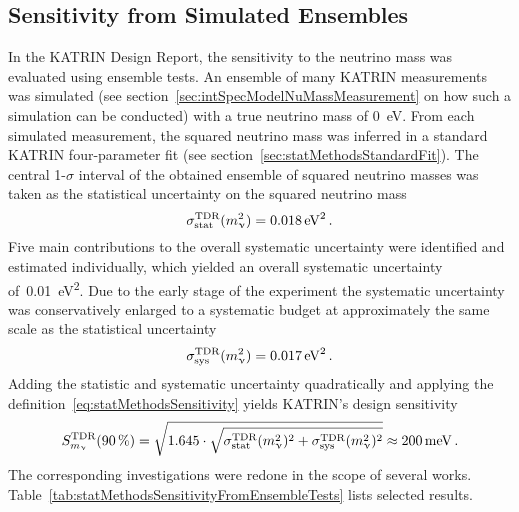 \subsection{Sensitivity from Simulated Ensembles}
\label{sec:statMethodsSensitivtyFromEnsemble}
In the KATRIN Design Report, the sensitivity to the neutrino mass was evaluated using ensemble tests. An ensemble of many KATRIN measurements was simulated (see section~\ref{sec:intSpecModelNuMassMeasurement} on how such a simulation can be conducted) with a true neutrino mass of \SI{0}{eV}. From each simulated measurement, the squared neutrino mass was inferred in a standard KATRIN four-parameter fit (see section~\ref{sec:statMethodsStandardFit}). The central 1-$\sigma$ interval of the obtained ensemble of squared neutrino masses was taken as the statistical uncertainty on the squared neutrino mass~\cite{Angrik:2005ep}
\begin{equation}
	\sigma_\mathrm{stat}^\mathrm{TDR}(m_\upnu^2) = \SI{0.018}{eV^2}
	\text{\,.}
\end{equation}
Five main contributions to the overall systematic uncertainty were identified and estimated individually, which yielded an overall systematic uncertainty of~\SI{0.01}{eV^2}. Due to the early stage of the experiment the systematic uncertainty was conservatively enlarged to a systematic budget at approximately the same scale as the statistical uncertainty~\cite{Angrik:2005ep}
\begin{equation}
	\label{eq:statMethodsSensitivtyFromEnsembleTDRSysBudget}
	\sigma_\mathrm{sys}^\mathrm{TDR}(m_\upnu^2) = \SI{0.017}{eV^2}
	\text{\,.}
\end{equation}
Adding the statistic and systematic uncertainty quadratically and applying the definition~\eqref{eq:statMethodsSensitivity} yields KATRIN's design sensitivity~\cite{Angrik:2005ep}
\begin{equation}
	\label{eq:statMethodsSensitivityDesignReport}
	S_{m_\upnu}^{\mathrm{TDR}}(\SI{90}{\percent}) = 
	\sqrt{1.645\cdot
		\sqrt{
		\sigma_\mathrm{stat}^\mathrm{TDR}(m_\upnu^2)^2+\sigma_\mathrm{sys}^\mathrm{TDR}(m_\upnu^2)^2
	}}
	\approx \SI{200}{meV}
	\text{\,.}
\end{equation}
The corresponding investigations were redone in the scope of several works. Table~\ref{tab:statMethodsSensitivityFromEnsembleTests} lists selected results.
